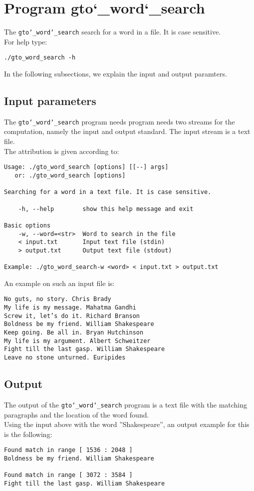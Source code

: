 \section{Program gto\char`_word\char`_search}
The \texttt{gto\char`_word\char`_search} search for a word in a file. It is case sensitive.\\
For help type:
\begin{lstlisting}
./gto_word_search -h
\end{lstlisting}
In the following subsections, we explain the input and output paramters.

\subsection*{Input parameters}

The \texttt{gto\char`_word\char`_search} program needs program needs two streams for the computation, namely the input and output standard. The input stream is a text file.\\
The attribution is given according to:
\begin{lstlisting}
Usage: ./gto_word_search [options] [[--] args]
   or: ./gto_word_search [options]

Searching for a word in a text file. It is case sensitive.

    -h, --help        show this help message and exit

Basic options
    -w, --word=<str>  Word to search in the file
    < input.txt       Input text file (stdin)
    > output.txt      Output text file (stdout)

Example: ./gto_word_search-w <word> < input.txt > output.txt
\end{lstlisting}
An example on such an input file is:
\begin{lstlisting}
No guts, no story. Chris Brady
My life is my message. Mahatma Gandhi
Screw it, let’s do it. Richard Branson
Boldness be my friend. William Shakespeare
Keep going. Be all in. Bryan Hutchinson
My life is my argument. Albert Schweitzer
Fight till the last gasp. William Shakespeare
Leave no stone unturned. Euripides
\end{lstlisting}

\subsection*{Output}
The output of the \texttt{gto\char`_word\char`_search} program is a text file with the matching paragraphs and the location of the word found.\\
Using the input above with the word ''Shakespeare'', an output example for this is the following:
\begin{lstlisting}
Found match in range [ 1536 : 2048 ]
Boldness be my friend. William Shakespeare

Found match in range [ 3072 : 3584 ]
Fight till the last gasp. William Shakespeare
\end{lstlisting}